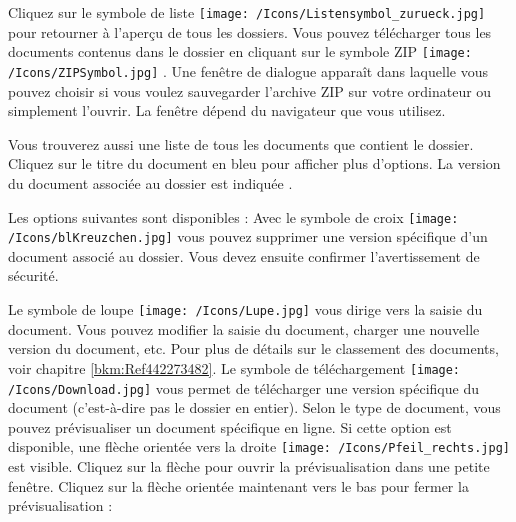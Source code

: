 Cliquez sur le symbole de liste \texttt{[image: /Icons/Listensymbol\_zurueck.jpg]}  pour retourner à l'aperçu de tous les dossiers. Vous pouvez télécharger tous les documents contenus dans le dossier en cliquant sur le symbole ZIP \texttt{[image: /Icons/ZIPSymbol.jpg]} . Une fenêtre de dialogue apparaît dans laquelle vous pouvez choisir si vous voulez sauvegarder l'archive ZIP sur votre ordinateur ou simplement l'ouvrir. La fenêtre dépend du navigateur que vous utilisez. \newline

Vous trouverez aussi une liste de tous les documents que contient le dossier. Cliquez sur le titre du document en bleu  pour afficher plus d'options. La version du document associée au dossier est indiquée . \newline

Les options suivantes sont disponibles :
Avec le symbole de croix \texttt{[image: /Icons/blKreuzchen.jpg]}  vous pouvez supprimer une version spécifique d'un document associé au dossier. Vous devez ensuite confirmer l'avertissement de sécurité.

\begin{figure}[H]
\end{figure}

Le symbole de loupe \texttt{[image: /Icons/Lupe.jpg]}  vous dirige vers la saisie du document. Vous pouvez modifier la saisie du document, charger une nouvelle version du document, etc. Pour plus de détails sur le classement des documents, voir chapitre \ref{bkm:Ref442273482}. Le symbole de téléchargement \texttt{[image: /Icons/Download.jpg]}  vous permet de télécharger une version spécifique du document (c'est-à-dire pas le dossier en entier). Selon le type de document, vous pouvez prévisualiser un document spécifique en ligne. Si cette option est disponible, une flèche orientée vers la droite \texttt{[image: /Icons/Pfeil\_rechts.jpg]}  est visible. Cliquez sur la flèche pour ouvrir la prévisualisation dans une petite fenêtre. Cliquez sur la flèche orientée maintenant vers le bas pour fermer la prévisualisation :

